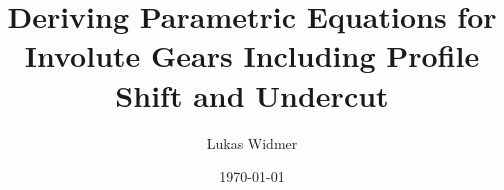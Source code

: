 \documentclass[11pt, a4paper]{article}
\title{Deriving Parametric Equations for Involute Gears Including Profile Shift and Undercut}
\author[1]{Lukas Widmer}
\date{\today}
\begin{document}
\maketitle

\tableofcontents

\newpage











\printbibliography
\label{sec:bibliography}
\end{document}
